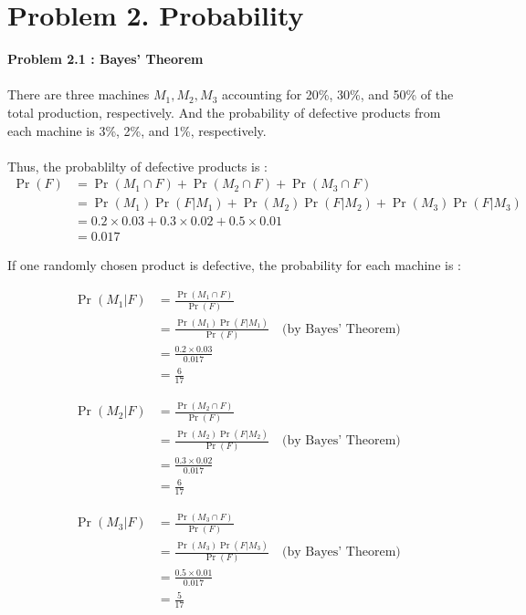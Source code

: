 \section*{Problem 2. Probability}

\textbf{Problem 2.1 : Bayes' Theorem} \\
\\
There are three machines $M_1, M_2, M_3$ accounting for 20\%, 30\%, and 50\% of the total production, respectively. And the probability of defective products from each machine is 3\%, 2\%, and 1\%, respectively. \\
\\
Thus, the probablilty of defective products is :
\begin{align*}
    \Pr(F) &= \Pr(M_1 \cap F) + \Pr(M_2 \cap F) + \Pr(M_3 \cap F) \\
    &= \Pr(M_1) \Pr(F|M_1) + \Pr(M_2) \Pr(F|M_2) + \Pr(M_3) \Pr(F|M_3) \\
    &= 0.2 \times 0.03 + 0.3 \times 0.02 + 0.5 \times 0.01 \\
    &= 0.017
\end{align*}

\noindent If one randomly chosen product is defective, the probability for each machine is :

\begin{align*}
    \Pr(M_1|F) &= \frac{\Pr(M_1 \cap F)}{\Pr(F)} \\
    &= \frac{\Pr(M_1) \Pr(F|M_1)}{\Pr(F)} \quad \text{(by Bayes' Theorem)} \\
    &= \frac{0.2 \times 0.03}{0.017} \\
    &= \frac{6}{17}
\end{align*}

\begin{align*}
    \Pr(M_2|F) &= \frac{\Pr(M_2 \cap F)}{\Pr(F)} \\
    &= \frac{\Pr(M_2) \Pr(F|M_2)}{\Pr(F)} \quad \text{(by Bayes' Theorem)} \\
    &= \frac{0.3 \times 0.02}{0.017} \\
    &= \frac{6}{17}
\end{align*}

\begin{align*}
    \Pr(M_3|F) &= \frac{\Pr(M_3 \cap F)}{\Pr(F)} \\
    &= \frac{\Pr(M_3) \Pr(F|M_3)}{\Pr(F)} \quad \text{(by Bayes' Theorem)} \\
    &= \frac{0.5 \times 0.01}{0.017} \\
    &= \frac{5}{17}
\end{align*}\\

